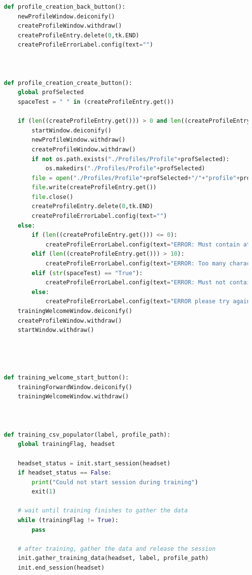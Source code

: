 \documentclass[conference]{IEEEtran}
\begin{document}
\begin{lstlisting}[language=Python, caption=GUI CODE, label=gui_code]
def profile_creation_back_button():
    newProfileWindow.deiconify()
    createProfileWindow.withdraw()
    createProfileEntry.delete(0,tk.END)
    createProfileErrorLabel.config(text="")



def profile_creation_create_button():
    global profSelected
    spaceTest = " " in (createProfileEntry.get())
    
    if (len((createProfileEntry.get())) > 0 and len((createProfileEntry.get())) <= 10 and str(spaceTest) == "False"):
        startWindow.deiconify()
        newProfileWindow.withdraw()
        createProfileWindow.withdraw()
        if not os.path.exists("./Profiles/Profile"+profSelected):
            os.makedirs("./Profiles/Profile"+profSelected)              # creates individual profile folders if they do not exist.
        file = open("./Profiles/Profile"+profSelected+"/"+"profile"+profSelected+"Config"+".txt", "w")
        file.write(createProfileEntry.get())
        file.close()
        createProfileEntry.delete(0,tk.END)
        createProfileErrorLabel.config(text="")
    else:
        if (len((createProfileEntry.get())) <= 0):
            createProfileErrorLabel.config(text="ERROR: Must contain at least one character!")
        elif (len((createProfileEntry.get())) > 10):
            createProfileErrorLabel.config(text="ERROR: Too many characters!")
        elif (str(spaceTest) == "True"):
            createProfileErrorLabel.config(text="ERROR: Must not contain spaces!")
        else:
            createProfileErrorLabel.config(text="ERROR please try again!")
    trainingWelcomeWindow.deiconify()
    createProfileWindow.withdraw()
    startWindow.withdraw()




def training_welcome_start_button():
    trainingForwardWindow.deiconify()
    trainingWelcomeWindow.withdraw()



def training_csv_populator(label, profile_path):
    global trainingFlag, headset

    headset_status = init.start_session(headset)
    if headset_status == False:
        print("Could not start session during training")
        exit(1)

    # wait until training finishes to gather the data
    while (trainingFlag != True):
        pass

    # after training, gather the data and release the session
    init.gather_training_data(headset, label, profile_path)
    init.end_session(headset)




\end{lstlisting}
\end{document}
